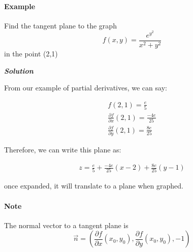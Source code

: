 \documentclass[11pt,fleqn]{book} %
\begin{document}
\paragraph{Example}

Find the tangent plane to the graph $$f(x,y) = \frac{e^{y^{2}}}{x^2+y^2}$$ in the point (2,1)

\textit{\textbf{Solution}}

From our example of partial derivatives, we can say:

\begin{gather}
    f(2,1) = \frac{e}{5}\\
    \frac{\partial f}{\partial x} (2,1) =  \frac{-4e}{25}\\
    \frac{\partial f}{\partial y} (2,1) =  \frac{8e}{25}
\end{gather}

Therefore, we can write this plane as:

\begin{gather}
    z = \frac{e}{5} + \frac{-4e}{25}(x - 2) + \frac{8e}{25}(y - 1)
\end{gather}

once expanded, it will translate to a plane when graphed.

\paragraph*{Note}

The normal vector to a tangent plane is $$\vec{n} = (\frac{\partial f}{\partial x} (x_0, y_0), \frac{\partial f}{\partial y} (x_0, y_0), -1)$$
\end{document}
